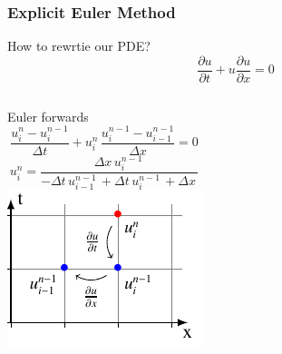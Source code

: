 %
%
%

\begin{frame}
  \frametitle{Explicit Euler Method}
  How to rewrtie our PDE?
  $$ \frac {\partial u}{\partial t}+u{\frac {\partial u}{\partial x}}=0 $$

\end{frame}



\begin{frame}
  \begin{columns}
    Euler forwards
  $$\frac{u_{i}^{n}-u_{i}^{n-1}}{\Delta t}+ u_{i}^{n}\, \frac{u_{i}^{n-1}-u_{i-1}^{n-1}}{\Delta x}=0$$
  $$ u_{i}^{n} = \frac{\Delta{x}\, u^{n-1}_{i}\,}{- \Delta{t}\, u^{n-1}_{i-1}\, + \Delta{t}\, u^{n-1}_{i}\, + \Delta{x}\,}$$
    \includegraphics[width=\linewidth]{../BurgersEquation/tikz/linear1/linear1.pdf}\\
  \end{columns}
\end{frame}

